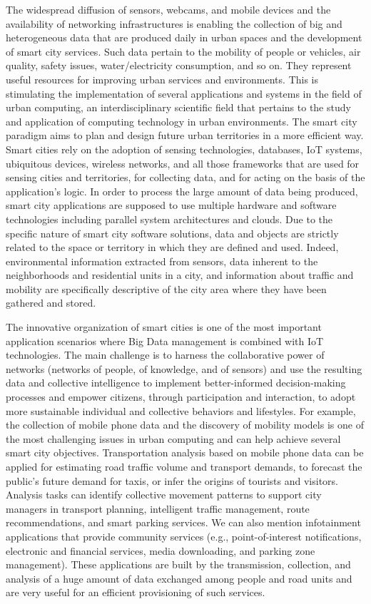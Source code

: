 The widespread diffusion of sensors, webcams, and mobile devices and the availability of networking infrastructures is enabling the collection of big and heterogeneous data that are produced daily in urban spaces and the development of smart city services. Such data pertain to the mobility of people or vehicles, air quality, safety issues, water/electricity consumption, and so on. They represent useful resources for improving urban services and environments. This is stimulating the implementation of several applications and systems in the field of urban computing, an interdisciplinary scientific field that pertains to the study and application of computing technology in urban environments. The smart city paradigm aims to plan and design future urban territories in a more efficient way. Smart cities rely on the adoption of sensing technologies, databases, IoT systems, ubiquitous devices, wireless networks, and all those frameworks that are used for sensing cities and territories, for collecting data, and for acting on the basis of the application's logic. In order to process the large amount of data being produced, smart city applications are supposed to use multiple hardware and software technologies including parallel system architectures and clouds. Due to the specific nature of smart city software solutions, data and\vadjust{\vspace*{-18pt}\pagebreak} objects are strictly related to the space or territory in which they are defined and used. Indeed, environmental information extracted from sensors, data inherent to the neighborhoods and residential units in a city, and information about traffic and mobility are specifically descriptive of the city area where they have been gathered and stored.

The innovative organization of smart cities is one of the most important application scenarios where Big Data management is combined with IoT technologies. The main challenge is to harness the collaborative power of networks (networks of people, of knowledge, and of sensors) and use the resulting data and collective intelligence to implement better-informed decision-making processes and empower citizens, through participation and interaction, to adopt more sustainable individual and collective behaviors and lifestyles. For example, the collection of mobile phone data and the discovery of mobility models is one of the most challenging issues in urban computing and can help achieve several smart city objectives. Transportation analysis based on mobile phone data can be applied for \hbox{estimating} road traffic volume and transport demands, to forecast the public's future demand for taxis, or infer the origins of tourists and visitors. \hbox{Analysis} tasks can identify collective movement patterns to support city managers in transport planning, intelligent traffic management, route recommendations, and smart parking services. We can also mention infotainment applications that provide community services (e.g., point-of-interest notifications, electronic and financial services, media downloading, and parking zone management). These applications are built by the transmission, collection, and analysis of a huge amount of data exchanged among people and road units and are very useful for an efficient provisioning of such services.

